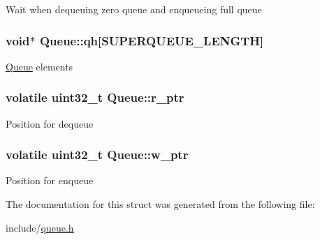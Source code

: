 \-Wait when dequeuing zero queue and enqueueing full queue \hypertarget{structQueue_ab34d99ddf5ae2378b7650eee04d4d9f6}{
\subsubsection[{qh}]{\setlength{\rightskip}{0pt plus 5cm}void$\ast$ {\bf \-Queue\-::qh}\mbox{[}{\bf \-S\-U\-P\-E\-R\-Q\-U\-E\-U\-E\-\_\-\-L\-E\-N\-G\-T\-H}\mbox{]}}}\label{structQueue_ab34d99ddf5ae2378b7650eee04d4d9f6}
\hyperlink{structQueue}{\-Queue} elements \hypertarget{structQueue_a5c8a29652b60443a047efca289d2c194}{
\subsubsection[{r\-\_\-ptr}]{\setlength{\rightskip}{0pt plus 5cm}volatile uint32\-\_\-t {\bf \-Queue\-::r\-\_\-ptr}}}\label{structQueue_a5c8a29652b60443a047efca289d2c194}
\-Position for dequeue \hypertarget{structQueue_ae6233729638e50046b3db9d009a51bdc}{
\subsubsection[{w\-\_\-ptr}]{\setlength{\rightskip}{0pt plus 5cm}volatile uint32\-\_\-t {\bf \-Queue\-::w\-\_\-ptr}}}\label{structQueue_ae6233729638e50046b3db9d009a51bdc}
\-Position for enqueue 

\-The documentation for this struct was generated from the following file\-:\begin{DoxyCompactItemize}
\item 
include/\hyperlink{queue_8h}{queue.\-h}\end{DoxyCompactItemize}
